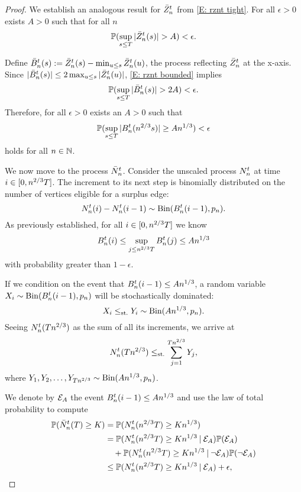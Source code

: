 \begin{proof}
We establish an analogous result for $\bar{Z}^t_n$ from \eqref{E: rznt tight}.
For all $\epsilon > 0$ exists $A>0$ such that for all $n$
\begin{equation} \label{E: rznt bounded}
\mathbb{P}(\sup_{s \leq T} |\bar{Z}^t_n(s)| > A) < \epsilon.
\end{equation}

Define $\bar{B}_n^t(s) := \bar{Z}^t_n(s) - \min_{u \leq s}\bar{Z}^t_n(u)$, the process reflecting $\bar{Z}^t_n$ at the x-axis.
Since $|\bar{B}_n^t(s)| \leq 2\max_{u \leq s}|\bar{Z}^t_n(u)|$, \eqref{E: rznt bounded} implies
\begin{equation} \label{E: rzminz bounded}
\mathbb{P}(\sup_{s \leq T} |\bar{B}_n^t(s)| > 2A) < \epsilon.
\end{equation}
Therefore, for all $\epsilon > 0$ exists an $A>0$ such that
\begin{equation}
\mathbb{P}( \sup_{s \leq T} |B_n^t(n^{2 / 3}s)| \geq An^{1 / 3} ) < \epsilon
\end{equation}
holds for all $n \in \mathbb{N}$.

We now move to the process $\bar{N}_n^t$. Consider the unscaled process $N_n^t$ at time $i \in [0, n^{2 / 3}T]$.
The increment to its next step is binomially distributed on the number of vertices eligible for a surplus edge:
\begin{equation}
N_n^t(i) - N_n^t(i-1) \sim \operatorname*{Bin}(B_n^t(i-1), p_n).
\end{equation}
As previously established, for all $i \in [0, n^{2 / 3}T]$ we know 
\begin{equation}
	B_n^t(i) \leq \sup_{j \leq n^{2 / 3}T} B_n^t(j) \leq An^{1 / 3}
\end{equation}
with probability greater than $1-\epsilon$.

If we condition on the event that $B_n^t(i-1) \leq An^{1 / 3}$, a random variable $X_i \sim \operatorname*{Bin}(B_n^t(i-1), p_n)$ will be stochastically dominated:
\begin{equation}
X_i \leq_{\text{st.}} Y_i \sim \operatorname*{Bin}(An^{1 / 3}, p_n).
\end{equation}
Seeing $N_n^t(Tn^{2 / 3})$ as the sum of all its increments, we arrive at
\begin{equation} \label{E: nnt stoch dominance}
N_n^t(Tn^{2 / 3}) \leq_{\text{st.}} \sum_{j=1}^{Tn^{2 / 3}} Y_j,
\end{equation}
where $Y_1, Y_2, \dots, Y_{Tn^{2 / 3}} \sim \operatorname*{Bin}(An^{1 / 3}, p_n)$.

We denote by $\mathcal{E}_{A}$ the event $B_n^t(i-1) \leq An^{1 / 3}$ and use the law of total probability to compute
\begin{equation} \label{E: First Total Probability Argument}
\begin{aligned}
\mathbb{P}(\bar{N}_n^t(T) \geq K) 
&= \mathbb{P}(N_n^t(n^{2 / 3}T) \geq Kn^{1 / 3}) \\
&=  \mathbb{P}(N_n^t(n^{2 / 3}T) \geq Kn^{1 / 3} \: | \: \mathcal{E}_{A}) \mathbb{P}(\mathcal{E}_{A}) \\
&\quad + \mathbb{P}(N_n^t(n^{2 / 3}T) \geq Kn^{1 / 3} \: | \: \neg\mathcal{E}_{A}) \mathbb{P}(\neg \mathcal{E}_{A}) \\
&\leq \mathbb{P}(N_n^t(n^{2 / 3}T) \geq Kn^{1 / 3} \: | \: \mathcal{E}_{A}) + \epsilon, \\
\end{aligned}	
\end{equation}


\end{proof}
